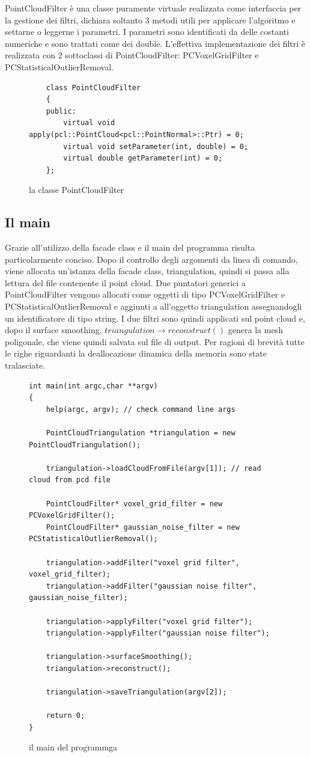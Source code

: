 \documentclass[a4paper,12pt]{article}
\begin{document}
	PointCloudFilter è una classe puramente virtuale realizzata come interfaccia per la gestione dei filtri,
	dichiara soltanto 3 metodi utili per applicare l'algoritmo e settarne o leggerne i parametri.
	I parametri sono identificati da delle costanti numeriche e sono trattati come dei double.
	L'effettiva implementazione dei filtri è realizzata con 2 sottoclassi di PointCloudFilter: PCVoxelGridFilter
	e PCStatisticalOutlierRemoval.
	\ 
	\begin{figure}[H]
	\begin{lstlisting}
	class PointCloudFilter
	{
	public:
    	virtual void apply(pcl::PointCloud<pcl::PointNormal>::Ptr) = 0;
    	virtual void setParameter(int, double) = 0;
    	virtual double getParameter(int) = 0;
	};
	\end{lstlisting}
	\label{fig:PointCloudFilter}
	\caption{la classe PointCloudFilter}
	\end{figure}
	\clearpage
	\subsection{Il main}
	Grazie all'utilizzo della facade class e il main del programma risulta particolarmente conciso.
	Dopo il controllo degli argomenti da linea di comando, viene allocata un'istanza della facade class, 
	triangulation, quindi si passa alla lettura del file contenente il point cloud. 
	Due puntatori generici a PointCloudFilter vengono allocati come oggetti di tipo PCVoxelGridFilter e
	PCStatisticalOutlierRemoval e aggiunti a all'oggetto triangulation assegnandogli un identificatore di
	tipo string. I due filtri sono quindi applicati sul point cloud e, dopo il surface smoothing, 
	$triangulation\rightarrow reconstruct()$ genera la mesh poligonale, che viene quindi salvata sul file di output.
	Per ragioni di brevità tutte le righe riguardanti la deallocazione dinamica della memoria sono state tralasciate.
	\begin{figure}[H]
	\begin{lstlisting}
int main(int argc,char **argv)
{
    help(argc, argv); // check command line args
    
    PointCloudTriangulation *triangulation = new PointCloudTriangulation();

    triangulation->loadCloudFromFile(argv[1]); // read cloud from pcd file

    PointCloudFilter* voxel_grid_filter = new PCVoxelGridFilter();
    PointCloudFilter* gaussian_noise_filter = new PCStatisticalOutlierRemoval();

    triangulation->addFilter("voxel grid filter", voxel_grid_filter);
    triangulation->addFilter("gaussian noise filter", gaussian_noise_filter);

    triangulation->applyFilter("voxel grid filter");
    triangulation->applyFilter("gaussian noise filter");

    triangulation->surfaceSmoothing();
    triangulation->reconstruct();

    triangulation->saveTriangulation(argv[2]);

    return 0;
}
	\end{lstlisting}
	\label{fig:main}
	\caption{il main del programmga}	
	\end{figure}
	\clearpage
\end{document}
